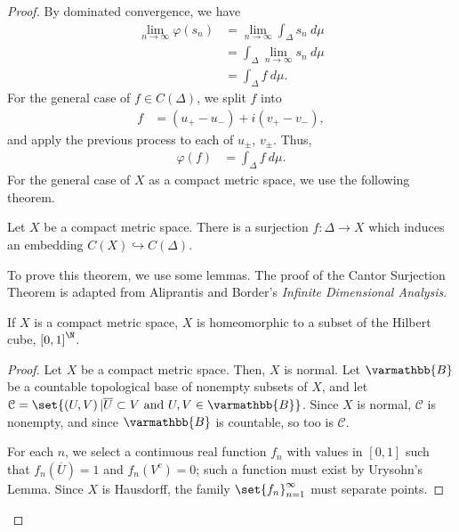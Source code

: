 \documentclass[10pt]{mypackage}
\renewcommand*{\mathbb}[1]{\varmathbb{#1}}
\newcommand{\B}{\mathbb{B}}
\begin{document}
\begin{proof}
  By dominated convergence, we have
  \begin{align*}
    \lim_{n\rightarrow\infty}\varphi\left(s_n\right) &= \lim_{n\rightarrow\infty}\int_{\Delta}^{} s_n\:d\mu\\
                                                     &= \int_{\Delta}^{} \lim_{n\rightarrow\infty}s_n\:d\mu\\
                                                     &= \int_{\Delta}^{} f\:d\mu.
  \end{align*}
  For the general case of $f\in C\left(\Delta\right)$, we split $f$ into
  \begin{align*}
    f &= \left(u_{+} - u_{-}\right) + i\left(v_{+} - v_{-}\right),
  \end{align*}
  and apply the previous process to each of $u_{\pm}$, $v_{\pm}$. Thus,
  \begin{align*}
    \varphi(f) &= \int_{\Delta}^{} f\:d\mu.
  \end{align*}
  For the general case of $X$ as a compact metric space, we use the following theorem.
  \begin{theorem}
    Let $X$ be a compact metric space. There is a surjection $f: \Delta \rightarrow X$ which induces an embedding $C(X) \hookrightarrow C\left(\Delta\right)$.
  \end{theorem}
  To prove this theorem, we use some lemmas. The proof of the Cantor Surjection Theorem is adapted from Aliprantis and Border's \textit{Infinite Dimensional Analysis}.
  \begin{lemma}
    If $X$ is a compact metric space, $X$ is homeomorphic to a subset of the Hilbert cube, $\left[0,1\right]^{\N}$.
  \end{lemma}
  \begin{proof}
    Let $X$ be a compact metric space. Then, $X$ is normal. Let $\B$ be a countable topological base of nonempty subsets of $X$, and let $\mathcal{C} = \set{\left(U,V\right)| \overline{U}\subset V\text{ and }U,V\in \B}$. Since $X$ is normal, $\mathcal{C}$ is nonempty, and since $\B$ is countable, so too is $\mathcal{C}$.\newline

    For each $n$, we select a continuous real function $f_n$ with values in $[0,1]$ such that $f_n\left(\overline{U}\right) = 1$ and $f_n\left(V^{c}\right) = 0$; such a function must exist by Urysohn's Lemma. Since $X$ is Hausdorff, the family $\set{f_n}_{n=1}^{\infty}$ must separate points.\newline


\end{proof}
\end{proof}
\end{document}

